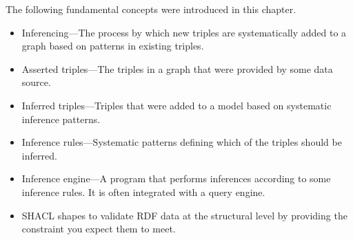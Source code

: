 The following fundamental concepts were introduced in this chapter.

\begin{itemize}
\item Inferencing---The process by which new triples are systematically added
to a graph based on patterns in existing triples.

\item Asserted triples---The triples in a graph that were provided by some
data source.

\item Inferred triples---Triples that were added to a model based on
systematic inference patterns.

\item Inference rules---Systematic patterns defining which of the triples
should be inferred.

\item Inference engine---A program that performs inferences according to some
inference rules. It is often integrated with a query engine.

\item
  SHACL shapes to validate RDF data at the structural level by providing
  the constraint you expect them to meet.
  \end{itemize}
  
